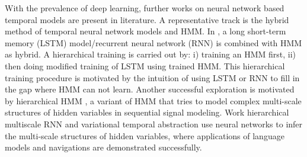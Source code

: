 With the prevalence of deep learning, further works on neural network based temporal models are present in literature. A representative track is the hybrid method of temporal neural network models and HMM. In \cite{liu2019lstmHmmHyb,buys2018bridging,vik2016rnnHmm}, a long short-term memory (LSTM) model/recurrent neural network (RNN) is combined with HMM as hybrid. A hierarchical training is carried out by: i) training an HMM first, ii) then doing modified training of LSTM using trained HMM. This hierarchical training procedure is motivated by the intuition of using LSTM or RNN to fill in the gap where HMM can not learn.
Another successful exploration is motivated by hierarchical HMM \cite{fine1998hierarchicalHMM}, a variant of HMM that tries to model complex multi-scale structures of hidden variables in sequential signal modeling. Work hierarchical multiscale RNN \cite{chung2016hmRNN} and variational temporal abstraction \cite{kim2019variational} use neural networks to infer the multi-scale structures of hidden variables, where applications of language models and navigations are demonstrated successfully.


